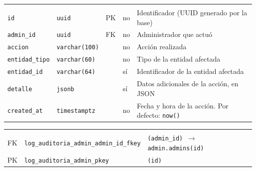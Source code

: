 {\small
\begin{xltabular}{\textwidth}{@{}>{\raggedright\arraybackslash}p{3.6cm} >{\raggedright\arraybackslash}p{2.3cm} >{\raggedright\arraybackslash}p{1cm} >{\centering\arraybackslash}p{0.85cm} L@{}}
    \toprule
     &  &  &  &  \\
    \midrule
    \endfirsthead
    \toprule
     &  &  &  &  \\
    \midrule
    \endhead
    \bottomrule
    \endfoot
    \texttt{id} & \texttt{uuid} & PK & no & Identificador (UUID generado por la base) \\
    \texttt{admin\_\allowbreak{}id} & \texttt{uuid} & FK & no & Administrador que actuó \\
    \texttt{accion} & \texttt{varchar(\allowbreak{}100)} &  & no & Acción realizada \\
    \texttt{entidad\_\allowbreak{}tipo} & \texttt{varchar(\allowbreak{}60)} &  & no & Tipo de la entidad afectada \\
    \texttt{entidad\_\allowbreak{}id} & \texttt{varchar(\allowbreak{}64)} &  & sí & Identificador de la entidad afectada \\
    \texttt{detalle} & \texttt{jsonb} &  & sí & Datos adicionales de la acción, en JSON \\
    \texttt{created\_\allowbreak{}at} & \texttt{timestamptz} &  & no & Fecha y hora de la acción. Por defecto: \texttt{now(\allowbreak{})} \\
\end{xltabular}
}

{\small
\begin{xltabular}{\textwidth}{@{}>{\raggedright\arraybackslash}p{1.7cm} >{\raggedright\arraybackslash}p{4.6cm} L@{}}
    \toprule
     &  &  \\
    \midrule
    \endfirsthead
    \toprule
     &  &  \\
    \midrule
    \endhead
    \bottomrule
    \endfoot
    FK & \texttt{log\_\allowbreak{}auditoria\_\allowbreak{}admin\_\allowbreak{}admin\_\allowbreak{}id\_\allowbreak{}fkey} & \texttt{(\allowbreak{}admin\_\allowbreak{}id) $\rightarrow$ admin.admins(\allowbreak{}id)} \\
    PK & \texttt{log\_\allowbreak{}auditoria\_\allowbreak{}admin\_\allowbreak{}pkey} & \texttt{(\allowbreak{}id)} \\
\end{xltabular}
}

